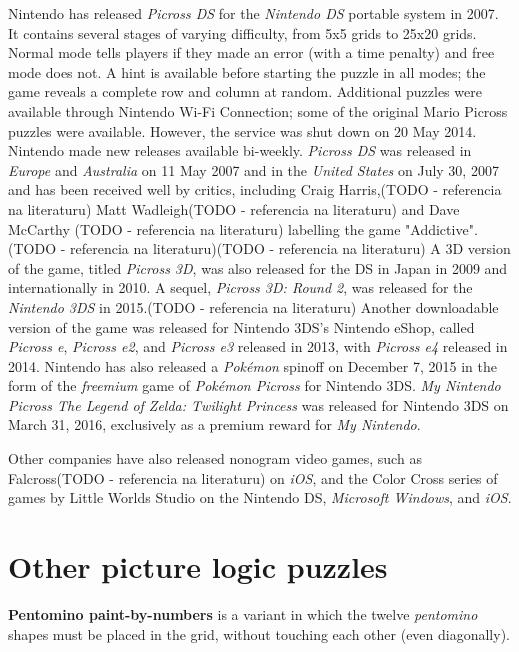 Nintendo has released \textit{\textit{Picross DS}} for the \textit{Nintendo DS} portable system in 2007. It contains several stages of varying difficulty, from 5x5 grids to 25x20 grids. Normal mode tells players if they made an error (with a time penalty) and free mode does not. A hint is available before starting the puzzle in all modes; the game reveals a complete row and column at random. Additional puzzles were available through Nintendo Wi-Fi Connection; some of the original Mario Picross puzzles were available. However, the service was shut down on 20 May 2014. Nintendo made new releases available bi-weekly. \textit{Picross DS} was released in \textit{Europe} and \textit{Australia} on 11 May 2007 and in the \textit{United States} on July 30, 2007 and has been received well by critics, including Craig Harris,(TODO - referencia na literaturu) Matt Wadleigh(TODO - referencia na literaturu) and Dave McCarthy (TODO - referencia na literaturu) labelling the game "Addictive".(TODO - referencia na literaturu)(TODO - referencia na literaturu) A 3D version of the game, titled \textit{\textit{Picross 3D}}, was also released for the DS in Japan in 2009 and internationally in 2010. A sequel, \textit{\textit{Picross 3D: Round 2}}, was released for the \textit{Nintendo 3DS} in 2015.(TODO - referencia na literaturu) Another downloadable version of the game was released for Nintendo 3DS's Nintendo eShop, called \textit{Picross e}, \textit{Picross e2}, and \textit{Picross e3} released in 2013, with \textit{Picross e4} released in 2014. Nintendo has also released a \textit{Pokémon} spinoff on December 7, 2015 in the form of the \textit{freemium} game of \textit{\textit{Pokémon Picross}} for Nintendo 3DS. \textit{My Nintendo Picross \textit{The Legend of Zelda: Twilight Princess}} was released for Nintendo 3DS on March 31, 2016, exclusively as a premium reward for \textit{My Nintendo}.

Other companies have also released nonogram video games, such as Falcross(TODO - referencia na literaturu) on \textit{iOS}, and the Color Cross series of games by Little Worlds Studio on the Nintendo DS, \textit{Microsoft Windows}, and \textit{iOS}.


\chapter{Other picture logic puzzles}

\textbf{Pentomino paint-by-numbers} is a variant in which the twelve \textit{pentomino} shapes must be placed in the grid, without touching each other (even diagonally).

